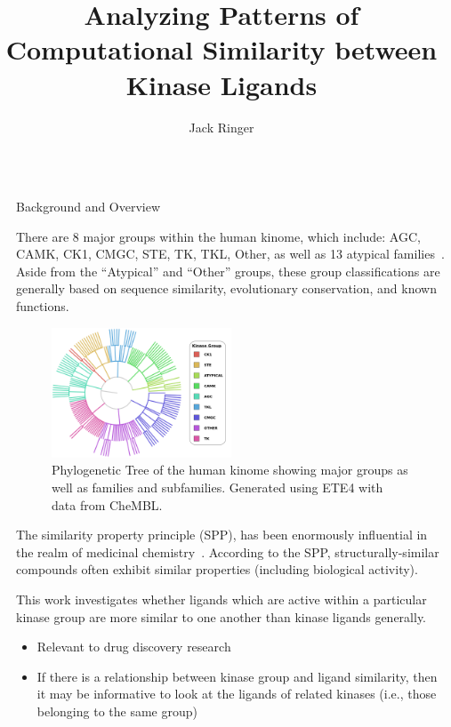 \documentclass[final]{beamer}
\title{Analyzing Patterns of Computational Similarity between Kinase Ligands}
\author{Jack Ringer}
\institute[shortinst]{University of New Mexico}
\newlength{\sepwidth}
\newlength{\colwidth}
\newcommand{\separatorcolumn}{\begin{column}{\sepwidth}\end{column}}
\begin{document}
\begin{frame}[t]
\begin{columns}[t]
\separatorcolumn

\begin{column}{\colwidth}

  \begin{block}{Background and Overview}
   \small

 There are 8 major groups within the human kinome, which include: AGC, CAMK, CK1, CMGC, STE, TK, TKL, Other, as well as 13 atypical families~\cite{eid_turk_volkamer_rippmann_fulle_2017, manning_2002}. Aside from the ``Atypical'' and ``Other'' groups, these group classifications are generally based on sequence similarity, evolutionary conservation, and known functions. 

\begin{figure}[H]
    \centering
    \includegraphics[width=0.5\textwidth]{../figures/protein_family_tree.png}
    \caption{Phylogenetic Tree of the human kinome showing major groups as well as families and subfamilies. Generated using ETE4 with data from CheMBL.}
    \label{fig:fam_tree}
\end{figure}

The similarity property principle (SPP), has been enormously influential in the realm of medicinal chemistry~\cite{maggiora_vogt_stumpfe_bajorath_2013}. According to the SPP, structurally-similar compounds often exhibit similar properties (including biological activity). 

This work investigates whether ligands which are active within a particular kinase group are more similar to one another than kinase ligands generally. 
    \begin{itemize}
        \item Relevant to drug discovery research
        \item If there is a relationship between kinase group and ligand similarity, then it may be informative to look at the ligands of related kinases (i.e., those belonging to the same group)
    \end{itemize}


\end{block}
\end{column}
\end{columns}
\end{frame}
\end{document}
